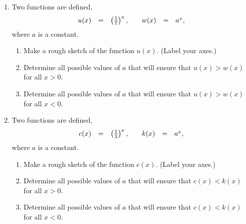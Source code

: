 \begin{enumerate}
\item Two functions are defined,
  \begin{equation*}
    \begin{array}{rcl@{\hspace{2em}}rcl}
      u(x) & = & \left(\frac{5}{7}\right)^x, & w(x) & = & a^x,
    \end{array}
  \end{equation*}
  where $a$ is a constant.
  \begin{enumerate}
  \item Make a rough sketch of the function $u(x)$. (Label your axes.)
  \item Determine all possible values of $a$ that will ensure that
    $u(x)>w(x)$ for all $x>0$.
  \item Determine all possible values of $a$ that will ensure that
    $u(x)>w(x)$ for all $x<0$.
  \end{enumerate}

\item Two functions are defined,
  \begin{equation*}
    \begin{array}{rcl@{\hspace{2em}}rcl}
      c(x) & = & \left(\frac{1}{3}\right)^x, & k(x) & = & a^x,
    \end{array}
  \end{equation*}
  where $a$ is a constant.
  \begin{enumerate}
  \item Make a rough sketch of the function $c(x)$. (Label your axes.)
  \item Determine all possible values of $a$ that will ensure that
    $c(x)<k(x)$ for all $x>0$.
  \item Determine all possible values of $a$ that will ensure that
    $c(x)<k(x)$ for all $x<0$.
  \end{enumerate}


\end{enumerate}

